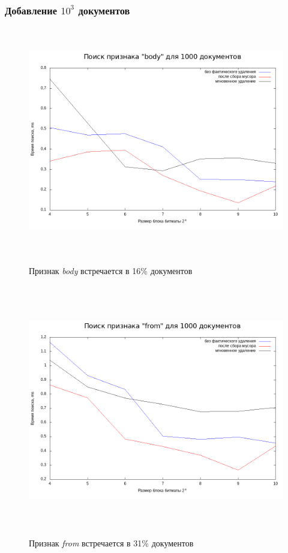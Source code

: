 \subsubsection{Добавление $10^3$ документов}

\begin{figure}[H]
\includegraphics[width=\linewidth, height=10cm]{fig/limit_1e6/1e3/body_time.png}
\caption{Признак \textit{body} встречается в 16\% документов}
\includegraphics[width=\linewidth, height=11cm]{fig/limit_1e6/1e3/from_time.png}
\caption{Признак \textit{from} встречается в 31\% документов}
\end{figure}

